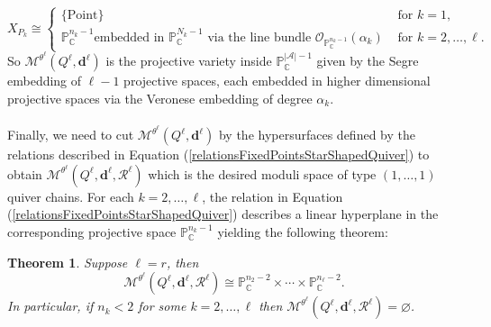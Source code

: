 \documentclass{amsart}
\theoremstyle{plain}
\newtheorem{theorem}{Theorem}[section]
\numberwithin{equation}{section}
\theoremstyle{definition}
\theoremstyle{remark}
\begin{document}
	$$
	X_{P_k}\cong \begin{cases}
		\{\text{Point}\} & \text{ for }k=1,\\
		\mathbb{P}_{\mathbb{C}}^{n_k-1} \text{embedded in }\mathbb{P}_{\mathbb{C}}^{N_k-1} \text{ via the line bundle }\mathcal{O}_{\mathbb{P}_\mathbb{C}^{n_k-1}}(\alpha_k) & \text{ for }k=2,\ldots,\ell.
	\end{cases}
	$$
	So $\mathcal{M}^{\theta^\ell}(Q^\ell,\mathbf{d}^\ell)$ is the projective variety inside $\mathbb{P}_{\mathbb{C}}^{|\mathscr{A}|-1}$ given by the Segre embedding of $\ell-1$ projective spaces, each embedded in higher dimensional projective spaces via the Veronese embedding of degree $\alpha_k$. 
	\\
	\\
	Finally, we need to cut $\mathcal{M}^{\theta^\ell}(Q^\ell,\mathbf{d}^\ell)$ by the hypersurfaces defined by the relations described in Equation (\ref{relationsFixedPointsStarShapedQuiver}) to obtain $\mathcal{M}^{\theta^\ell}(Q^\ell,\mathbf{d}^\ell,\mathcal{R}^\ell)$ which is the desired moduli space of type $(1,\ldots,1)$ quiver chains. For each $k=2,\ldots,\ell$, the relation in Equation (\ref{relationsFixedPointsStarShapedQuiver}) describes a linear hyperplane in the corresponding projective space $\mathbb{P}_\mathbb{C}^{n_k-1}$ yielding the following theorem:
	\begin{theorem}\label{classificationType1...1QuiverChains}
	Suppose $\ell=r$, then 
	$$
	\mathcal{M}^{\theta^\ell}(Q^\ell,\mathbf{d}^\ell,\mathcal{R}^\ell)\cong 	\mathbb{P}^{n_2-2}_{\mathbb{C}}\times \cdots \times \mathbb{P}^{n_\ell-2}_{\mathbb{C}}.
	$$	
	In particular, if $n_k<2$ for some $k=2,\ldots,\ell$ then $	\mathcal{M}^{\theta^\ell}(Q^\ell,\mathbf{d}^\ell,\mathcal{R}^\ell)=\varnothing$. 
	\end{theorem}
	
\end{document}
